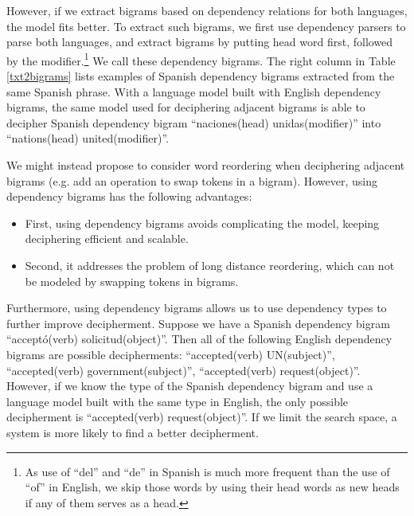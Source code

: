 However, if we extract bigrams based on dependency relations for both languages, the model fits better. To extract such bigrams, we first use dependency parsers to parse both languages, and extract bigrams by putting head word first, followed by the modifier.\footnote{As use of ``del'' and ``de'' in Spanish is much more frequent than the use of ``of'' in English, we skip those words by using their head words as new heads if any of them serves as a head.} We call these dependency bigrams. The right column in Table \ref{txt2bigrams} lists examples of Spanish dependency bigrams extracted from the same Spanish phrase. With a language model built with English dependency bigrams, the same model used for deciphering adjacent bigrams is able to decipher Spanish dependency bigram ``naciones(head) unidas(modifier)'' into ``nations(head) united(modifier)''.

We might instead propose to consider word reordering when deciphering adjacent bigrams (e.g. add an operation to swap tokens in a bigram). However, using dependency bigrams has the following advantages:

\begin{itemize}
\item  First, using dependency bigrams avoids complicating the model, keeping deciphering efficient and scalable.
\item  Second, it addresses the problem of long distance reordering, which can not be modeled by swapping tokens in bigrams.
\end{itemize}

Furthermore, using dependency bigrams allows us to use dependency types to further improve decipherment. Suppose we have a Spanish dependency bigram ``accept\'{o}(verb) solicitud(object)''. Then all of the following English dependency bigrams are possible decipherments: ``accepted(verb) UN(subject)'', ``accepted(verb) government(subject)'', ``accepted(verb) request(object)''. However, if we know the type of the Spanish dependency bigram and use a language model built with the same type in English, the only possible decipherment is ``accepted(verb) request(object)''. If we limit the search space, a system is more likely to find a better decipherment.  